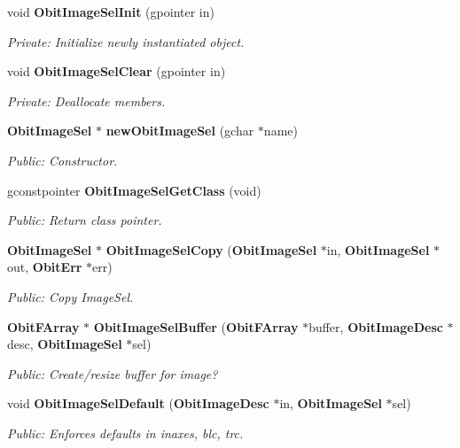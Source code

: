 \begin{CompactItemize}
\item 
void {\bf Obit\-Image\-Sel\-Init} (gpointer in)
\begin{CompactList}\small\item\em Private: Initialize newly instantiated object. \item\end{CompactList}\item 
void {\bf Obit\-Image\-Sel\-Clear} (gpointer in)
\begin{CompactList}\small\item\em Private: Deallocate members. \item\end{CompactList}\item 
{\bf Obit\-Image\-Sel} $\ast$ {\bf new\-Obit\-Image\-Sel} (gchar $\ast$name)
\begin{CompactList}\small\item\em Public: Constructor. \item\end{CompactList}\item 
gconstpointer {\bf Obit\-Image\-Sel\-Get\-Class} (void)
\begin{CompactList}\small\item\em Public: Return class pointer. \item\end{CompactList}\item 
{\bf Obit\-Image\-Sel} $\ast$ {\bf Obit\-Image\-Sel\-Copy} ({\bf Obit\-Image\-Sel} $\ast$in, {\bf Obit\-Image\-Sel} $\ast$out, {\bf Obit\-Err} $\ast$err)
\begin{CompactList}\small\item\em Public: Copy Image\-Sel. \item\end{CompactList}\item 
{\bf Obit\-FArray} $\ast$ {\bf Obit\-Image\-Sel\-Buffer} ({\bf Obit\-FArray} $\ast$buffer, {\bf Obit\-Image\-Desc} $\ast$desc, {\bf Obit\-Image\-Sel} $\ast$sel)
\begin{CompactList}\small\item\em Public: Create/resize buffer for image? \item\end{CompactList}\item 
void {\bf Obit\-Image\-Sel\-Default} ({\bf Obit\-Image\-Desc} $\ast$in, {\bf Obit\-Image\-Sel} $\ast$sel)
\begin{CompactList}\small\item\em Public: Enforces defaults in inaxes, blc, trc. \item\end{CompactList}\item 

\end{CompactItemize}
